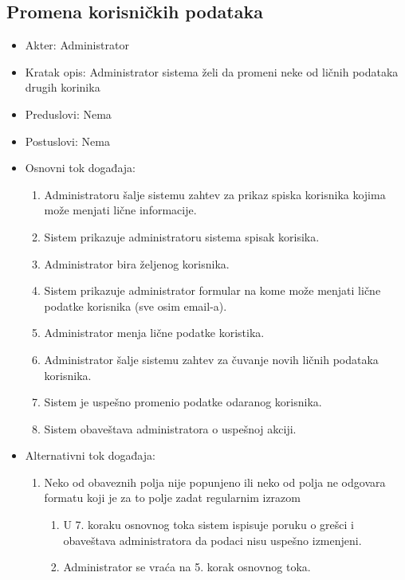 \documentclass[a4paper]{article}
\begin{document}
\subsection{Promena korisničkih podataka}
\begin{itemize}
    \item Akter: Administrator
    \item Kratak opis: Administrator sistema želi da promeni neke od ličnih podataka drugih korinika
    \item Preduslovi: Nema
    \item Postuslovi: Nema
    \item Osnovni tok događaja:
        \begin{enumerate}
            \item Administratoru šalje sistemu zahtev za prikaz spiska korisnika kojima može menjati lične informacije.
            \item Sistem prikazuje administratoru sistema spisak korisika.
            \item Administrator bira željenog korisnika.
            \item Sistem prikazuje administrator formular na kome može menjati lične podatke korisnika (sve osim email-a).
            \item Administrator menja lične podatke koristika.
            \item Administrator šalje sistemu zahtev za čuvanje novih ličnih podataka korisnika.
            \item Sistem je uspešno promenio podatke odaranog korisnika.
            \item Sistem obaveštava administratora o uspešnoj akciji.
        \end{enumerate}
    \item Alternativni tok događaja:
        \begin{enumerate}
            \item Neko od obaveznih polja nije popunjeno ili neko od polja ne odgovara formatu koji je za to polje zadat regularnim izrazom
                \begin{enumerate}
                    \item U 7. koraku osnovnog toka sistem ispisuje poruku o grešci i obaveštava administratora da podaci nisu uspešno izmenjeni.
                    \item Administrator se vraća na 5. korak osnovnog toka.
                \end{enumerate}
        \end{enumerate}
\end{itemize}
\end{document}
